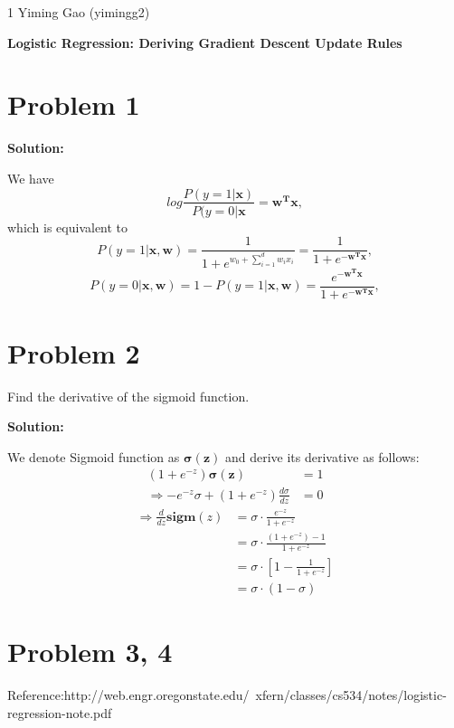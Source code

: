 \documentclass[11pt]{article}
\begin{document}
\homework
    {1}
    {Yiming Gao (yimingg2)}
    {}

\begin{center}
      \Large\textbf{Logistic Regression: Deriving Gradient Descent Update Rules}\\
\end{center}

\section*{Problem 1}
\textbf{Solution:} 

We have 
$$log\frac{P(y = 1|\bm{x})}{P(y = 0|\bm{x}} = \bm{w^Tx},$$
which is equivalent to 
$$P(y = 1|\bm{x},\bm{w}) = \frac{1}{1 + e^{w_0+\sum_{i = 1}^d w_ix_i}} = \frac{1}{1+e^{-\bm{w^Tx}}},$$
$$P(y = 0|\bm{x},\bm{w}) = 1-P(y = 1|\bm{x},\bm{w}) = \frac{e^{-\bm{w^Tx}}}{1+e^{-\bm{w^Tx}}},$$


\section*{Problem 2}
Find the derivative of the sigmoid function.

\textbf{Solution:} 

We denote Sigmoid function as $\bm{\sigma(z)}$ and derive its derivative as follows:
\begin{align*}
 (1+e^{-z})\bm{\sigma(z)} &= 1\\
\Rightarrow -e^{-z}\sigma + (1+e^{-z})\frac{d\sigma}{dz}&=0
\end{align*}
\begin{align*}
\Rightarrow \frac{d}{dz}\bm{sigm}(z) &= \sigma \cdot \frac{e^{-z}}{1+e^{-z}}\\
& = \sigma \cdot \frac{(1+e^{-z})-1}{1+ e^{-z}}\\
& = \sigma \cdot [1-\frac{1}{1+e^{-z}}] \\
& = \sigma \cdot (1 - \sigma)
\end{align*}


\section*{Problem 3, 4}

Reference:http://web.engr.oregonstate.edu/~xfern/classes/cs534/notes/logistic-regression-note.pdf
\end{document}
